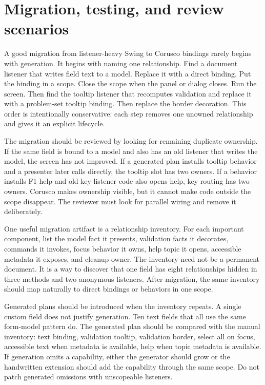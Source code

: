 \section{Migration, testing, and review scenarios}

A good migration from listener-heavy Swing to Corusco bindings rarely begins
with generation. It begins with naming one relationship. Find a document
listener that writes field text to a model. Replace it with a direct binding.
Put the binding in a scope. Close the scope when the panel or dialog closes.
Run the screen. Then find the tooltip listener that recomputes validation and
replace it with a problem-set tooltip binding. Then replace the border
decoration. This order is intentionally conservative: each step removes one
unowned relationship and gives it an explicit lifecycle.

The migration should be reviewed by looking for remaining duplicate ownership.
If the same field is bound to a model and also has an old listener that writes
the model, the screen has not improved. If a generated plan installs tooltip
behavior and a presenter later calls  directly, the tooltip
slot has two owners. If a behavior installs F1 help and old key-listener code
also opens help, key routing has two owners. Corusco makes ownership visible,
but it cannot make code outside the scope disappear. The reviewer must look for
parallel wiring and remove it deliberately.

One useful migration artifact is a relationship inventory. For each important
component, list the model fact it presents, validation facts it decorates,
commands it invokes, focus behavior it owns, help topic it opens, accessible
metadata it exposes, and cleanup owner. The inventory need not be a permanent
document. It is a way to discover that one field has eight relationships hidden
in three methods and two anonymous listeners. After migration, the same
inventory should map naturally to direct bindings or behaviors in one scope.

Generated plans should be introduced when the inventory repeats. A single
custom field does not justify generation. Ten text fields that all use the same
form-model pattern do. The generated plan should be compared with the manual
inventory: text binding, validation tooltip, validation border, select all on
focus, accessible text when metadata is available, help when topic metadata is
available. If generation omits a capability, either the generator should grow
or the handwritten extension should add the capability through the same scope.
Do not patch generated omissions with unscopeable listeners.

